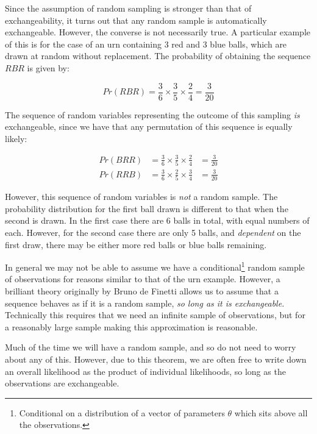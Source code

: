 \documentclass[11pt,fullpage]{book}
\begin{document}
Since the assumption of random sampling is stronger than that of exchangeability, it turns out that any random sample is automatically exchangeable. However, the converse is not necessarily true. A particular example of this is for the case of an urn containing 3 red and 3 blue balls, which are drawn at random without replacement. The probability of obtaining the sequence $RBR$ is given by:

\begin{equation}
Pr(RBR) = \frac{3}{6} \times \frac{3}{5} \times \frac{2}{4} = \frac{3}{20}
\end{equation}

The sequence of random variables representing the outcome of this sampling \textit{is} exchangeable, since we have that any permutation of this sequence is equally likely:

\begin{align}
Pr(BRR) &= \frac{3}{6} \times \frac{3}{5} \times \frac{2}{4} &= \frac{3}{20}\\
Pr(RRB) &= \frac{3}{6} \times \frac{2}{5} \times \frac{3}{4} &= \frac{3}{20}
\end{align}

However, this sequence of random variables is \textit{not} a random sample. The probability distribution for the first ball drawn is different to that when the second is drawn. In the first case there are 6 balls in total, with equal numbers of each. However, for the second case there are only 5 balls, and \textit{dependent} on the first draw, there may be either more red balls or blue balls remaining.

In general we may not be able to assume we have a conditional\footnote{Conditional on a distribution of a vector of parameters $\theta$ which sits above all the observations.} random sample of observations for reasons similar to that of the urn example. However, a brilliant theory originally by Bruno de Finetti allows us to assume that a sequence behaves as if it is a random sample, \textit{so long as it is exchangeable.} Technically this requires that we need an infinite sample of observations, but for a reasonably large sample making this approximation is reasonable.

Much of the time we will have a random sample, and so do not need to worry about any of this. However, due to this theorem, we are often free to write down an overall likelihood as the product of individual likelihoods, so long as the observations are exchangeable.
\end{document}
